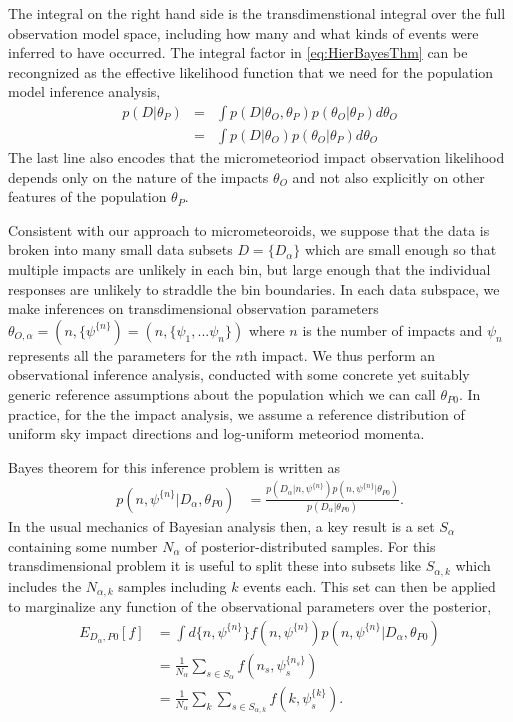 \documentclass[twocolumn,showpacs,aps,prd,nobibnotes,nofootinbib,floatfix]{revtex4-1}
\begin{document}
The integral on the right hand side is the transdimenstional integral over the full observation model space, including how many and what kinds of events were inferred to have occurred.  The integral factor in \eqref{eq:HierBayesThm} can be recongnized as the effective likelihood function that we need for the population model inference analysis,
\begin{eqnarray}
  p(D|\theta_P)&=&\int p(D|\theta_O,\theta_P)p(\theta_O|\theta_P)d\theta_O\nonumber\\
  &=&\int p(D|\theta_O)p(\theta_O|\theta_P)d\theta_O\label{eq:metaLike}
\end{eqnarray}
The last line also encodes that the micrometeoriod impact observation likelihood depends only on the nature of the impacts $\theta_O$ and not also explicitly on other features of the population $\theta_P$.

Consistent with our approach to micrometeoroids, we suppose that the data is broken into many small data subsets $D=\{D_\alpha\}$ which are small enough so that multiple impacts are unlikely in each bin, but large enough that the individual responses are unlikely to straddle the bin boundaries. 
In each data subspace, we make inferences on transdimensional observation parameters $\theta_{O,\alpha}=(n,\{\psi^{\{n\}})=(n,\{\psi_1,...\psi_n\})$ where $n$ is the number of impacts and $\psi_n$ represents all the parameters for the $n$th impact.
We thus perform an observational inference analysis, conducted with some concrete yet suitably generic reference assumptions about the population which we can call $\theta_{P0}$.  In practice, for the the impact analysis, we assume a reference distribution of uniform sky impact directions and log-uniform meteoriod momenta.

Bayes theorem for this inference problem is written as
\begin{align}
  p(n,\psi^{\{n\}}|D_\alpha,\theta_{P0})&= \frac{p(D_\alpha|n,\psi^{\{n\}})p(n,\psi^{\{n\}}|\theta_{P0})}{p(D_\alpha|\theta_{P0})}.\label{eq:ObsBayesThm}
\end{align}
In the usual mechanics of Bayesian analysis then, a key result is a set $S_\alpha$ containing some number $N_\alpha$  of posterior-distributed samples. For this transdimensional problem it is useful to split these into subsets like  $S_{\alpha,k}$ which includes the $N_{\alpha,k}$ samples including $k$ events each.  This set can then be applied to marginalize any function of the observational parameters over the posterior,
\begin{align}
  E_{D_\alpha,P0}[f] &=\int d\{n,\psi^{\{n\}}\}f(n,\psi^{\{n\}})p(n,\psi^{\{n\}}|D_\alpha,\theta_{P0})\label{eq:marg}\\
  &= \frac1{N_\alpha}\sum_{s\in S_\alpha}f(n_s,\psi_s^{\{n_s\}})\nonumber\\
  &= \frac1{N_\alpha}\sum_k\sum_{s\in S_{\alpha,k}}f(k,\psi_s^{\{k\}})\label{eq:marg-samp}. 
\end{align}
\end{document}
